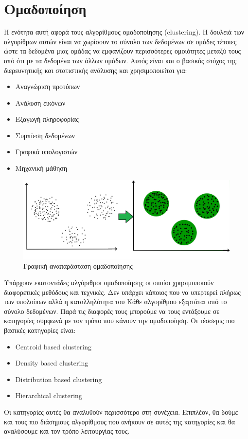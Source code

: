 \newpage
\section{Ομαδοποίηση}
Η ενότητα αυτή αφορά τους αλγορίθμους ομαδοποίησης (\textlatin{clustering}). Η δουλειά των
αλγορίθμων αυτών είναι να χωρίσουν το σύνολο των δεδομένων σε ομάδες τέτοιες ώστε τα δεδομένα μιας
ομάδας να εμφανίζουν περισσότερες ομοιότητες μεταξύ τους από ότι με τα δεδομένα των άλλων ομάδων.
Αυτός είναι και ο βασικός στόχος της διερευνητικής και στατιστικής ανάλυσης και χρησιμοποιείται
για\cite{wikicl}:
\begin{itemize}
    \item Αναγνώριση προτύπων
    \item Ανάλυση εικόνων
    \item Εξαγωγή πληροφορίας
    \item Συμπίεση δεδομένων
    \item Γραφικά υπολογιστών
    \item Μηχανική μάθηση
\end{itemize}
\begin{figure}[H]
    \centering
    \includegraphics[width=1\textwidth]{images/clustering_intro.jpg}
    \caption{Γραφική αναπαράσταση ομαδοποίησης}
\end{figure}
\sloppy
Υπάρχουν εκατοντάδες αλγόριθμοι ομαδοποίησης οι οποίοι χρησιμοποιούν διαφορετικές μεθόδους και
τεχνικές. Δεν υπάρχει κάποιος που να υπερτερεί πλήρως των υπολοίπων αλλά η καταλληλότητα του Κάθε
αλγορίθμου εξαρτάται από το σύνολο δεδομένων. Παρά τις διαφορές τους μπορούμε να τους εντάξουμε σε
κατηγορίες συμφωνά με τον τρόπο που κάνουν την ομαδοποίηση. Οι τέσσερις πιο βασικές κατηγορίες
είναι:
\fussy
\begin{itemize}
    \item \textlatin{Centroid based clustering}
    \item \textlatin{Density based clustering}
    \item \textlatin{Distribution based clustering}
    \item \textlatin{Hierarchical clustering}
\end{itemize}
Οι κατηγορίες αυτές θα αναλυθούν περισσότερο στη συνέχεια. Επιπλέον, θα δούμε και τους πιο διάσημους αλγορίθμους που ανήκουν σε αυτές της κατηγορίες και θα αναλύσουμε και τον τρόπο
λειτουργίας τους.

